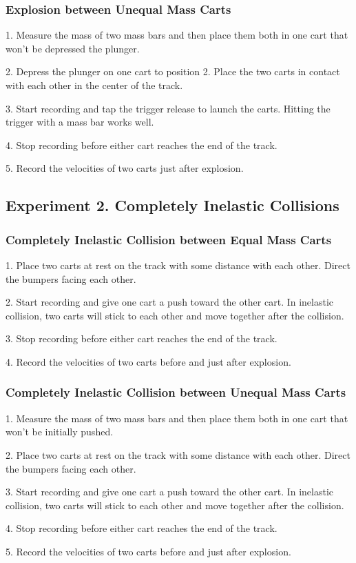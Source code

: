 \documentclass[12pt]{article}
\begin{document}
		\subsubsection{Explosion between Unequal Mass Carts}
		1. Measure the mass of two mass bars and then place them both in one cart that won't be depressed the plunger. \par 
		2. Depress the plunger on one cart to position 2. Place the two carts in contact with each other in the center of the track. \par 
		3. Start recording and tap the trigger release to launch the carts. Hitting the trigger with a mass bar works well. \par 
		4. Stop recording before either cart reaches the end of the track. \par 
		5. Record the velocities of two carts just after explosion. \par 
	\subsection{Experiment 2. Completely Inelastic Collisions}
		\subsubsection{Completely Inelastic Collision between Equal Mass Carts}
		1. Place two carts at rest on the track with some distance with each other. Direct the bumpers facing each other. \par
		2. Start recording and give one cart a push toward the other cart. In inelastic collision, two carts will stick to each other and move together after the collision. \par 
		3. Stop recording before either cart reaches the end of the track. \par 
		4. Record the velocities of two carts before and just after explosion. \par 
		\subsubsection{Completely Inelastic Collision between Unequal Mass Carts}
		1. Measure the mass of two mass bars and then place them both in one cart that won't be initially pushed. \par 
		2. Place two carts at rest on the track with some distance with each other. Direct the bumpers facing each other. \par
		3. Start recording and give one cart a push toward the other cart. In inelastic collision, two carts will stick to each other and move together after the collision.\par 
		4. Stop recording before either cart reaches the end of the track. \par 
		5. Record the velocities of two carts before and just after explosion. \par 
\end{document}
